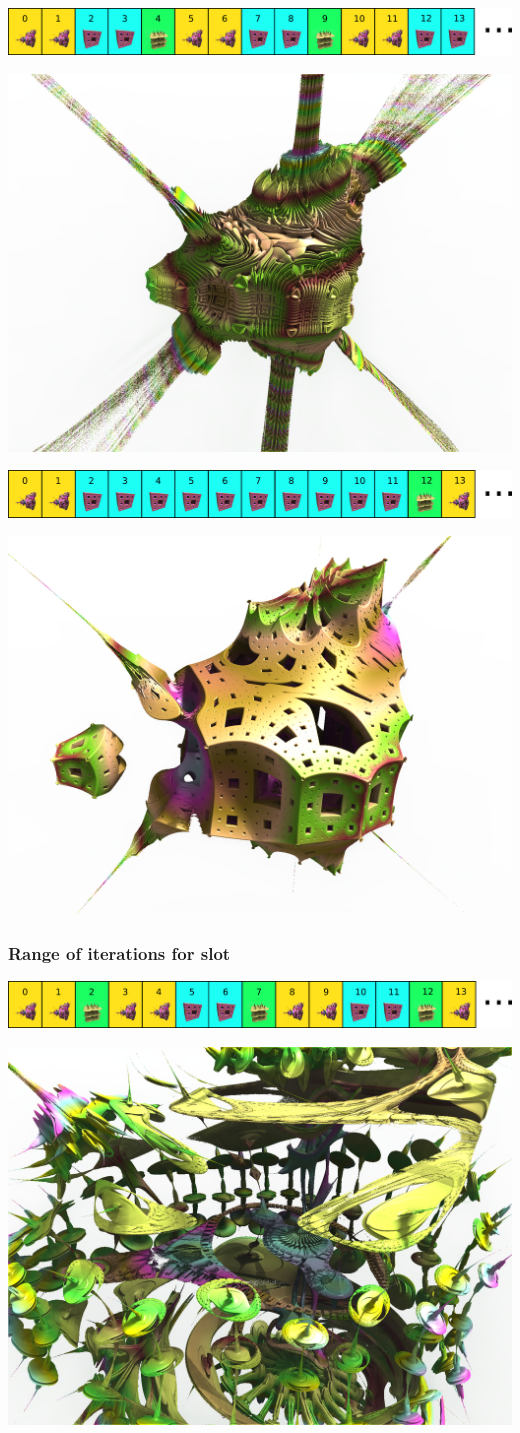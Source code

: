 \includegraphics[width=\linewidth]{img/manual/media/iteration_loop_hybrid_sequence_2.png}

\includegraphics[width=0.5\linewidth]{img/manual/media/hybrid_sequence_example_2.png}

\includegraphics[width=\linewidth]{img/manual/media/iteration_loop_hybrid_sequence_3.png}

\includegraphics[width=0.5\linewidth]{img/manual/media/hybrid_sequence_example_3.png}

\subsubsection{Range of iterations for slot}

\includegraphics[width=\linewidth]{img/manual/media/iteration_loop_hybrid_sequence_4.png}

\includegraphics[width=0.5\linewidth]{img/manual/media/hybrid_sequence_example_4.png}

